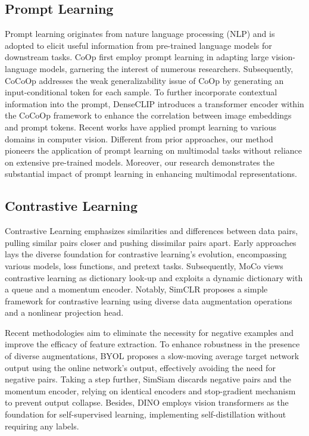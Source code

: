 \documentclass[letterpaper]{article} %
\begin{document}
\subsection{Prompt Learning}
Prompt learning originates from nature language processing (NLP) and is adopted to elicit useful information from pre-trained language models for downstream tasks. CoOp \cite{zhou2022learning} first employ prompt learning in adapting large vision-language models, garnering the interest of numerous researchers. Subsequently, CoCoOp \cite{zhou2022conditional} addresses the weak generalizability issue of CoOp by generating an input-conditional token for each sample. To further incorporate contextual information into the prompt, DenseCLIP \cite{rao2022denseclip} introduces a transformer encoder within the CoCoOp framework to enhance the correlation between image embeddings and prompt tokens. Recent works \cite{Wang_2022_CVPR, Li_2022_CVPR, gan2023decorate} have applied prompt learning to various domains in computer vision. Different from prior approaches, our method pioneers the application of prompt learning on multimodal tasks without reliance on extensive pre-trained models. Moreover, our research demonstrates the substantial impact of prompt learning in enhancing multimodal representations.

\subsection{Contrastive Learning}
Contrastive Learning emphasizes similarities and differences between data pairs, pulling similar pairs closer and pushing dissimilar pairs apart.
Early approaches  \cite{wu2018unsupervised, ye2019unsupervised, tian2020contrastive} lays the diverse foundation for contrastive learning's evolution, encompassing various models, loss functions, and pretext tasks.
Subsequently, MoCo \cite{he2020momentum} views contrastive learning as dictionary look-up and exploits a dynamic dictionary  with a queue and a momentum encoder. Notably, SimCLR \cite{chen2020simple} proposes a simple framework for contrastive learning using diverse data augmentation operations and a nonlinear projection head.

Recent methodologies aim to eliminate the necessity for negative examples and improve the efficacy of feature extraction. To enhance robustness in the presence of diverse augmentations, BYOL \cite{grill2020bootstrap} proposes a slow-moving average target network output using the online network's output, effectively avoiding the need for negative pairs. Taking a step further, SimSiam \cite{chen2021exploring} discards negative pairs and the momentum encoder, relying on identical encoders and stop-gradient mechanism to prevent output collapse. Besides, DINO \cite{caron2021emerging} employs vision transformers as the foundation for self-supervised learning, implementing self-distillation without requiring any labels.
\end{document}
